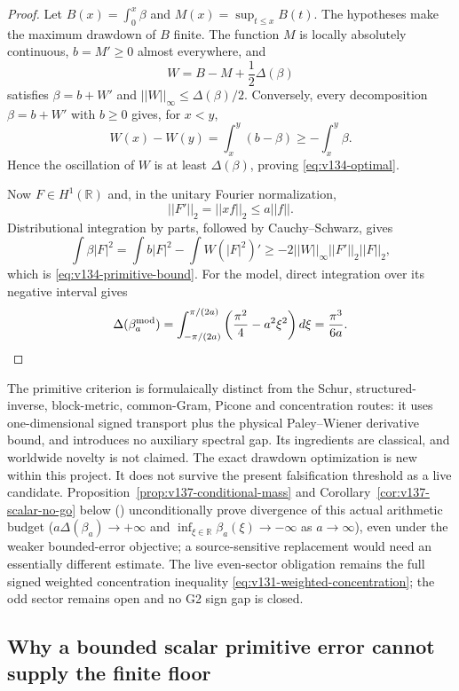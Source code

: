 \documentclass[11pt]{article}
\def\norm#1{||#1||}%
\theoremstyle{remark}
\newcommand{\norm}[1]{\left\lVert #1\right\rVert}
\begin{document}
\begin{proof}
Let $B(x)=\int_0^x\beta$ and
$M(x)=\sup_{t\le x}B(t)$.  The hypotheses make the maximum drawdown of
$B$ finite.  The function $M$ is locally absolutely continuous,
$b=M'\ge0$ almost everywhere, and
\[
 W=B-M+\frac12\Delta(\beta)
\]
satisfies $\beta=b+W'$ and
$\norm W_\infty\le\Delta(\beta)/2$.  Conversely, every decomposition
$\beta=b+W'$ with $b\ge0$ gives, for $x<y$,
\[
 W(x)-W(y)=\int_x^y(b-\beta)
 \ge-\int_x^y\beta.
\]
Hence the oscillation of $W$ is at least $\Delta(\beta)$, proving
\eqref{eq:v134-optimal}.

Now $F\in H^1(\mathbb R)$ and, in the unitary Fourier normalization,
\[
 \norm{F'}_2=\norm{xf}_2\le a\norm f.
\]
Distributional integration by parts, followed by Cauchy--Schwarz,
gives
\[
 \int\beta|F|^2
 =\int b|F|^2-\int W(|F|^2)'
 \ge-2\norm W_\infty\norm{F'}_2\norm F_2,
\]
which is \eqref{eq:v134-primitive-bound}.  For the model, direct
integration over its negative interval gives
\[
 \Delta(\beta_a^{\rm mod})
 =\int_{-\pi/(2a)}^{\pi/(2a)}
   \left(\frac{\pi^2}{4}-a^2\xi^2\right)d\xi
 =\frac{\pi^3}{6a}.
\]
\end{proof}

The primitive criterion is formulaically distinct from the Schur,
structured-inverse, block-metric, common-Gram, Picone and concentration
routes: it uses one-dimensional signed transport plus the physical
Paley--Wiener derivative bound, and introduces no auxiliary spectral
gap.  Its ingredients are classical, and worldwide novelty is not
claimed.  The exact drawdown optimization is new within this project.
It does not survive the present falsification threshold as a live
candidate. Proposition~\ref{prop:v137-conditional-mass} and Corollary~\ref{cor:v137-scalar-no-go} below () unconditionally prove divergence of this actual arithmetic budget ($a\Delta(\beta_a)\to+\infty$ and $\inf_{\xi\in\mathbb R}\beta_a(\xi)\to-\infty$ as $a\to\infty$), even under the weaker bounded-error objective; a source-sensitive replacement would need an essentially different estimate.  The live even-sector obligation remains the full
signed weighted concentration inequality
\eqref{eq:v131-weighted-concentration}; the odd sector remains open and
no G2 sign gap is closed.


\subsection{Why a bounded scalar primitive error cannot supply the finite floor}
\end{document}
